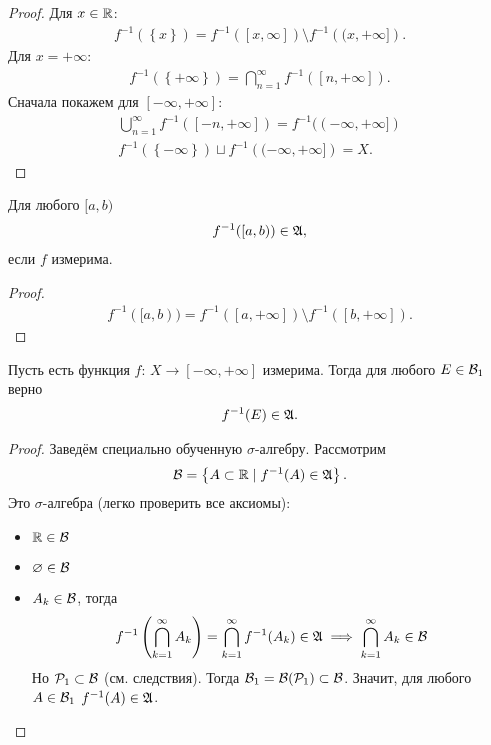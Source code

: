 \begin{proof} Для $x \in \mathbb{R}$:
 \begin{align*}
  f^{-1}( \left\{ x \right\} ) = f^{-1}( [x, \infty] ) \setminus f^{-1} \left( (x, +\infty] \right)
 .\end{align*}  Для $x = +\infty$:
 \begin{align*}
  f^{-1} \left( \left\{ +\infty \right\} \right) = \bigcap_{n=1}^{\infty} f^{-1} \left( [n, +\infty] \right)
 .\end{align*} Сначала покажем для $[-\infty, +\infty]$:
 \begin{align*}
  \bigcup_{n=1}^{\infty} f^{-1}([-n, +\infty]) = f^{-1}( (-\infty, +\infty] ) \\
  f^{-1}(\left\{ -\infty \right\}) \sqcup f^{-1} \left( (-\infty, +\infty] \right) = X
 .\end{align*}
\end{proof}
\begin{crly}
 Для любого $[a, b)$
 \begin{align*}
  f^{-1}([a, b)) \in \mathfrak{A}
 ,\end{align*} если $f$ измерима.
\end{crly}
\begin{proof}
 \begin{align*}
  f^{-1}( [a, b) ) = f^{-1} \left( [a, +\infty] \right) \setminus f^{-1} \left( [b, +\infty] \right)
 .\end{align*}
\end{proof}
\begin{thm}
 Пусть есть функция $f \colon\, X \to [-\infty, +\infty] $ измерима. Тогда для любого $E \in \mathcal{B}_1$ верно
 \begin{align*}
  f^{-1}(E) \in \mathfrak{A}
 .\end{align*}
\end{thm}
\begin{proof}
 Заведём специально обученную $\sigma$-алгебру. Рассмотрим
 \begin{align*}
  \mathcal{B} = \left\{ A \subset \mathbb{R} \mid f^{-1}(A) \in \mathfrak{A} \right\}
 .\end{align*} Это $\sigma$-алгебра (легко проверить все аксиомы):
 \begin{itemize}
  \item $\mathbb{R} \in \mathcal{B}$
  \item $\varnothing \in \mathcal{B}$
  \item $A_k \in \mathcal{B}$, тогда
   \begin{align*}
    f^{-1}\left(\bigcap_{k=1}^{\infty} A_k \right) = \bigcap_{k=1}^{\infty} f^{-1}(A_k) \in \mathfrak{A} \implies \bigcap_{k=1}^{\infty} A_k \in \mathcal{B}
   \end{align*}
   Но $\mathcal{P}_1 \subset \mathcal{B}$ (см. следствия). Тогда $\mathcal{B}_1 = \mathcal{B}(\mathcal{P}_1) \subset \mathcal{B}$. Значит, для любого  $A \in \mathcal{B}_1$ $f^{-1}(A) \in \mathfrak{A}$.
 \end{itemize}
\end{proof}

